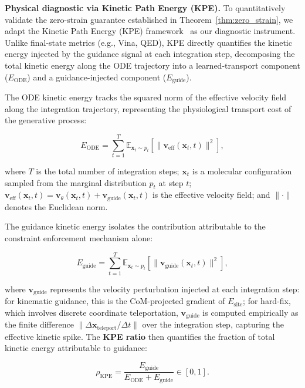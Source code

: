\documentclass{article}
\newcommand{\KPERatio}{\ensuremath{\rho_{\text{KPE}}}}
\newcommand{\xt}{\ensuremath{\bm{x}_t}}
\begin{document}
\textbf{Physical diagnostic via Kinetic Path Energy (KPE).}
To quantitatively validate the zero-strain guarantee established in
Theorem~\ref{thm:zero_strain}, we adapt the Kinetic Path Energy (KPE)
framework~\cite{li2026kpe} as our diagnostic instrument.  Unlike final-state
metrics (e.g., Vina, QED), KPE directly quantifies the kinetic energy injected
by the guidance signal at each integration step, decomposing the total kinetic
energy along the ODE trajectory into a learned-transport component
($E_{\text{ODE}}$) and a guidance-injected component ($E_{\text{guide}}$).

The ODE kinetic energy tracks the squared norm of the effective velocity field
along the integration trajectory, representing the physiological transport
cost of the generative process:

\begin{equation}\label{eq:ode_ke}
E_{\text{ODE}} = \sum_{t=1}^{T} \mathbb{E}_{\xt \sim p_t}\left[
  \|\bm{v}_{\text{eff}}(\xt, t)\|^2 \right],
\end{equation}

where $T$ is the total number of integration steps; $\xt$ is a molecular
configuration sampled from the marginal distribution $p_t$ at step $t$;
$\bm{v}_{\text{eff}}(\xt, t) = \bm{v}_\theta(\xt, t) +
\bm{v}_{\text{guide}}(\xt, t)$ is the effective velocity field; and
$\|\cdot\|$ denotes the Euclidean norm.

The guidance kinetic energy isolates the contribution attributable to the
constraint enforcement mechanism alone:

\begin{equation}\label{eq:guide_ke}
E_{\text{guide}} = \sum_{t=1}^{T} \mathbb{E}_{\xt \sim p_t}\left[
  \|\bm{v}_{\text{guide}}(\xt, t)\|^2 \right],
\end{equation}

where $\bm{v}_{\text{guide}}$ represents the velocity perturbation injected at
each integration step: for kinematic guidance, this is the CoM-projected
gradient of $E_{\text{site}}$; for hard-fix, which involves discrete
coordinate teleportation, $\bm{v}_{\text{guide}}$ is computed empirically as
the finite difference $\|\Delta\bm{x}_{\text{teleport}} / \Delta t\|$ over the
integration step, capturing the effective kinetic spike.  The \textbf{KPE
ratio} then quantifies the fraction of total kinetic energy attributable to
guidance:

\begin{equation}\label{eq:kpe_ratio}
\KPERatio = \frac{E_{\text{guide}}}{E_{\text{ODE}} + E_{\text{guide}}}
           \in [0, 1].
\end{equation}
\end{document}
